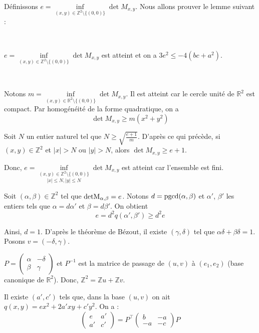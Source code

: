 
D{\'e}finissons $e = \underset{(x, y) \in \mathbb{Z}^2 \setminus \{(0,
0)\}}{\inf} \det M_{x, y}$. Nous allons prouver le lemme suivant :

\


$e = \underset{(x, y) \in \mathbb{Z}^2 \setminus \{(0, 0)\}}{\inf} \det M_{x,
y}$ est atteint et on a $3 e^2 \leq - 4 (bc + a^2)$.


\

Notons $m = \underset{(x, y) \in \mathbb{R}^2 \setminus \{(0, 0)\}}{\inf}
\det M_{x, y}$. Il est atteint car le cercle unit{\'e} de $\mathbb{R}^2$ est
compact. Par homog{\'e}n{\'e}it{\'e} de la forme quadratique, on a
\[ \det M_{x, y} \geq m (x^2 + y^2) \]


Soit $N$ un entier naturel tel que $N \geq \sqrt{\frac{e + 1}{m}}$.
D'apr{\`e}s ce qui pr{\'e}c{\`e}de, si $(x, y) \in \mathbb{Z}^2$ et $\lvert x
\rvert > N$ ou $\lvert y \rvert > N$, alors $\det M_{x, y} \geq e + 1$.

Donc, $e = \underset{\lvert x \rvert \leq N, \lvert y \rvert \leq
N}{\underset{(x, y) \in \mathbb{Z}^2 \setminus \{(0, 0)\}}{\inf}}  \det M_{x,
y}$ est atteint car l'ensemble est fini.

Soit $(\alpha, \beta) \in \mathbb{Z}^2$ tel que $\operatorname{detM}_{\alpha, \beta} =
e$. Notons $d = \operatorname{pgcd} (\alpha, \beta)$ et $\alpha'$, $\beta'$ les
entiers tels que $\alpha = d \alpha'$ et $\beta = d \beta'$. On obtient
\[ e = d^2 q (\alpha', \beta') \geq d^2 e \]


Ainsi, $d = 1$. D'apr{\`e}s le th{\'e}or{\`e}me de B{\'e}zout, il existe
$(\gamma, \delta)$ tel que $\alpha \delta + \beta \delta = 1$. Posons $v = (-
\delta, \gamma)$.

$P = \left(\begin{array}{cc}
  \alpha & - \delta\\
  \beta & \gamma
\end{array}\right)$ et $P^{- 1}$ est la matrice de passage de $(u, v)$ {\`a}
$(e_1, e_2)$ (base canonique de $\mathbb{R}^2$). Donc, $\mathbb{Z}^2
=\mathbb{Z}u +\mathbb{Z}v$.

Il existe $(a', c')$ tels que, dans la base $(u, v)$ on ait $q (x, y) = ex^2 +
2 a' xy + c' y^2$. On a :
\[ \left(\begin{array}{cc}
     e & a'\\
     a' & c'
   \end{array}\right) = P^{\top} \left(\begin{array}{cc}
     b & - a\\
     - a & - c
   \end{array}\right) P \]


